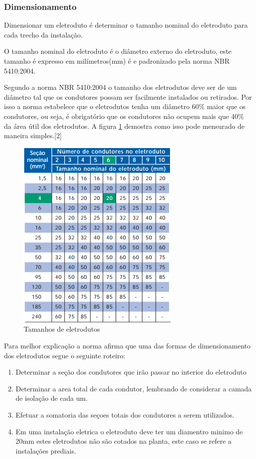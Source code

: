 \subsubsection{Dimensionamento}
Dimensionar um eletroduto é determinar o tamanho nominal do eletroduto para cada trecho da instalação.

O tamanho nominal do eletroduto é o diâmetro externo do eletroduto, este tamanho é expresso em milímetros(mm) é e padronizado pela norma NBR 5410:2004.

Segundo a norma NBR 5410:2004 o tamanho dos eletrodutos deve ser de um diâmetro tal que os condutores possam ser facilmente instalados ou retirados. Por isso a norma estabelece que o eletrodutos tenha um diâmetro 60\% maior que os condutores, ou seja, é obrigatório que os condutores não ocupem mais que 40\% da área útil dos eletrodutos. A figura \ref{tamanhos-eletrodutos} demostra como isso pode mensurado de maneira simples.[2]

\begin{figure}[h]
	\centering
	\includegraphics[scale=0.8]		{figuras/tamanho_eletroduto.png}
	\caption{Tamanhos de eletrodutos}
	\label{tamanhos-eletrodutos}
\end{figure}

Para melhor explicação a norma afirma que uma das formas de dimensionamento dos eletrodutos segue o seguinte roteiro:

\begin{enumerate}

	\item Determinar a seção dos condutores que irão passar no interior do eletroduto
	\item Determinar a area total de cada condutor, lembrando de considerar a camada de isolação de cada um.
	\item Efetuar a somatoria das seçoes totais dos condutores a serem utilizados.
	\item Em uma instalação eletrica o eletroduto deve ter um diamentro minimo de 20mm estes eletrodutos não são cotados na planta, este caso se refere a instalações prediais.
\end{enumerate}


